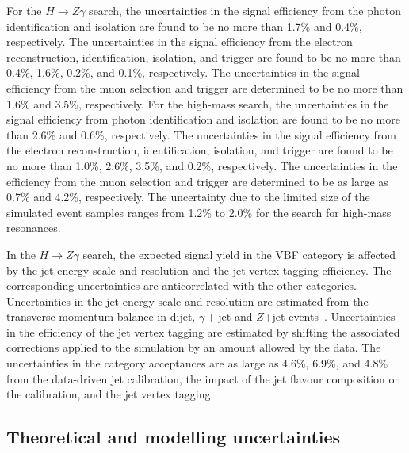 For the $H\to Z\gamma$ search, the uncertainties in the signal efficiency from the 
photon identification and isolation are found to be no more than 1.7\% and 0.4\%, respectively. 
The uncertainties in the signal efficiency
from the electron reconstruction, identification, isolation, and trigger are
found to be no more than 0.4\%, 1.6\%, 0.2\%, and 0.1\%, respectively. 
The uncertainties in the signal efficiency from the muon
selection and trigger are determined to be no more than 1.6\% and 3.5\%, respectively.
For the high-mass search, the uncertainties in the signal efficiency from 
photon identification and isolation are found to be no more than 2.6\% and 0.6\%, respectively. 
The uncertainties in the signal efficiency
from the electron reconstruction, identification, isolation, and trigger are
found to be no more than 1.0\%, 2.6\%, 3.5\%, and 0.2\%, respectively. 
The uncertainties in the efficiency from the muon
selection and trigger are determined to be as large as 0.7\% and 4.2\%, respectively.
The uncertainty due to the limited size of the simulated event samples ranges from 1.2\% to 2.0\% 
for the search for high-mass resonances.

In the $H\to Z\gamma$ search, the expected signal yield in the VBF category is 
affected by the jet energy scale and resolution and the jet vertex tagging efficiency. The corresponding 
uncertainties are anticorrelated with the other categories. Uncertainties
in the jet energy scale and resolution are estimated from 
the transverse momentum balance in dijet, $\gamma+$jet and $Z$+jet 
events~\cite{Aaboud:2017jcu}.
Uncertainties in the efficiency of the jet vertex tagging are estimated by shifting the associated 
corrections
applied to the simulation by an amount allowed by the data. The uncertainties in the category 
acceptances are as large as 4.6\%, 6.9\%, and 4.8\% from the data-driven jet calibration, the 
impact
of the jet flavour composition on the calibration, and the jet vertex tagging.


\subsection{Theoretical and modelling uncertainties}
\label{sec:unctheo}

